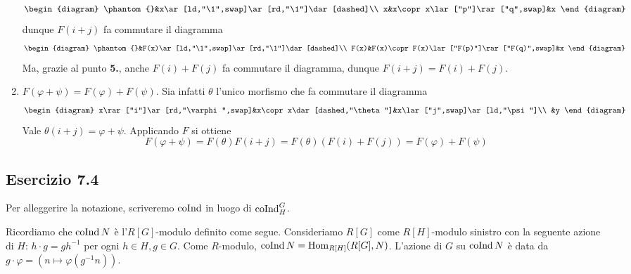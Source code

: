 \documentclass[a4paper]{article}
\begin{document}
\begin{enumerate}
$$\begin{diagram}
\phantom{}&x\ar[ld,"\1",swap]\ar[rd,"\1"]\dar[dashed]\\
x&x\copr x\lar["p"]\rar["q",swap]&x
\end{diagram}
$$
dunque $F(i+j)$ fa commutare il diagramma
$$
\begin{diagram}
\phantom{}&F(x)\ar[ld,"\1",swap]\ar[rd,"\1"]\dar[dashed]\\
F(x)&F(x)\copr F(x)\lar["F(p)"]\rar["F(q)",swap]&x
\end{diagram}
$$
Ma, grazie al punto \textbf{5.}, anche $F(i)+F(j)$ fa commutare il diagramma, dunque $F(i+j)=F(i)+F(j)$.
\item $F(\varphi+\psi)=F(\varphi)+F(\psi)$. Sia infatti $\theta$ l'unico morfismo che fa commutare il diagramma
$$
\begin{diagram}
x\rar["i"]\ar[rd,"\varphi",swap]&x\copr x\dar[dashed,"\theta"]&x\lar["j",swap]\ar[ld,"\psi"]\\
&y
\end{diagram}
$$
Vale $\theta(i+j)=\varphi+\psi$. Applicando $F$ si ottiene
$$
F(\varphi+\psi)=F(\theta)F(i+j)=F(\theta)(F(i)+F(j))=F(\varphi)+F(\psi)
$$
\end{enumerate}



\subsection*{Esercizio 7.4}
Per alleggerire la notazione, scriveremo $\operatorname{coInd}$ in luogo di $\operatorname{coInd}^G_H$.

Ricordiamo che $\operatorname{coInd} N$ è l'$R[G]$-modulo definito come segue. Consideriamo $R[G]$ come $R[H]$-modulo sinistro con la seguente azione di $H$: $h\cdot g=gh^{-1}$ per ogni $h\in H\comma g\in G$. Come $R$-modulo, $\operatorname{coInd} N=\operatorname{Hom}_{R[H]}(R[G],N)$. L'azione di $G$ su $\operatorname{coInd} N$ è data da $g\cdot\varphi=(n\mapsto\varphi(g^{-1}n))$.
\end{document}
